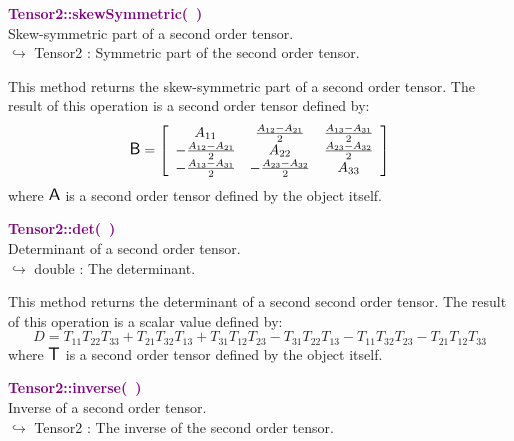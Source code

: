 \textcolor{purple}{\textbf{Tensor2::skewSymmetric(~)}}\label{Tensor2::skewSymmetric()}\\
Skew-symmetric part of a second order tensor.\\ \hspace*{10mm}$\hookrightarrow$ Tensor2 : Symmetric part of the second order tensor.

This method returns the skew-symmetric part of a second order tensor.
The result of this operation is a second order tensor defined by:
\begin{equation*}
\mbox{\large\ensuremath{\mathsf{B}}} = \left[\begin{array}{ccc}
 A_{11} & \frac{A_{12} - A_{21}}{2} & \frac{A_{13} - A_{31}}{2}\\
 -\frac{A_{12} -  A_{21}}{2} & A_{22} & \frac {A_{23} - A_{32}}{2}\\
 -\frac{A_{13} - A_{31}}{2} & -\frac {A_{23} - A_{32}}{2} & A_{33}\end{array}
\right]
\end{equation*}
where $\mbox{\large\ensuremath{\mathsf{A}}}$ is a second order tensor defined by the object itself.

\textcolor{purple}{\textbf{Tensor2::det(~)}}\label{Tensor2::det()}\\
Determinant of a second order tensor.\\ \hspace*{10mm}$\hookrightarrow$ double : The determinant.

This method returns the determinant of a second second order tensor.
The result of this operation is a scalar value defined by:
\begin{equation*}
D = T_{11} T_{22} T_{33} + T_{21} T_{32} T_{13} + T_{31} T_{12} T_{23} - T_{31} T_{22} T_{13} - T_{11} T_{32} T_{23} - T_{21} T_{12} T_{33}
\end{equation*}
where $\mbox{\large\ensuremath{\mathsf{T}}}$ is a second order tensor defined by the object itself.

\textcolor{purple}{\textbf{Tensor2::inverse(~)}}\label{Tensor2::inverse()}\\
Inverse of a second order tensor.\\ \hspace*{10mm}$\hookrightarrow$ Tensor2 : The inverse of the second order tensor.

